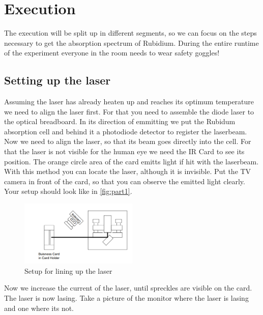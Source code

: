 \section{Execution}
\label{sec:Execution}

The execution will be split up in different segments, so we can focus on the steps necessary to get the absorption spectrum of Rubidium.
During the entire runtime of the experiment everyone in the room needs to wear safety goggles!

\subsection{Setting up the laser}
\label{ssec:exe1}

Assuming the laser has already heaten up and reaches its optimum temperature we need to align the laser first.
For that you need to assemble the diode laser to the optical breadboard.
In its direction of emmitting we put the Rubidum absorption cell and behind it a photodiode detector to register the laserbeam.
Now we need to align the laser, so that its beam goes directly into the cell.
For that the laser is not visible for the human eye we need the IR Card to see its position. 
The orange circle area of the card emitts light if hit with the laserbeam. 
With this method you can locate the laser, although it is invisible.
Put the TV camera in front of the card, so that you can observe the emitted light clearly.
Your setup should look like in \autoref{fig:part1}.
\begin{figure}
    \centering
    \includegraphics[width=0.5\textwidth]{images/part1.png}
    \caption{Setup for lining up the laser \cite{V60}}
    \label{fig:part1}
\end{figure}
Now we increase the current of the laser, until spreckles are visible on the card. 
The laser is now lasing. 
Take a picture of the monitor where the laser is lasing and one where its not.

